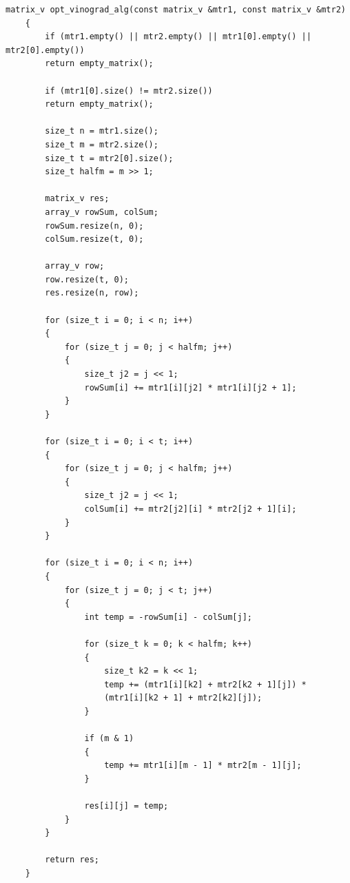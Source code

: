 \clearpage

\begin{lstlisting}[label={lst:opt_vinograd}, caption={Реализация оптимизированного алгоритма Винограда}]
	matrix_v opt_vinograd_alg(const matrix_v &mtr1, const matrix_v &mtr2)
	{
		if (mtr1.empty() || mtr2.empty() || mtr1[0].empty() || mtr2[0].empty())
		return empty_matrix();
		
		if (mtr1[0].size() != mtr2.size())
		return empty_matrix();
		
		size_t n = mtr1.size();
		size_t m = mtr2.size();
		size_t t = mtr2[0].size();
		size_t halfm = m >> 1;
		
		matrix_v res;
		array_v rowSum, colSum;
		rowSum.resize(n, 0);
		colSum.resize(t, 0);
		
		array_v row;
		row.resize(t, 0);
		res.resize(n, row);
		
		for (size_t i = 0; i < n; i++)
		{
			for (size_t j = 0; j < halfm; j++)
			{
				size_t j2 = j << 1;
				rowSum[i] += mtr1[i][j2] * mtr1[i][j2 + 1];
			}
		}
		
		for (size_t i = 0; i < t; i++)
		{
			for (size_t j = 0; j < halfm; j++)
			{
				size_t j2 = j << 1;
				colSum[i] += mtr2[j2][i] * mtr2[j2 + 1][i];
			}
		}
		
		for (size_t i = 0; i < n; i++)
		{
			for (size_t j = 0; j < t; j++)
			{
				int temp = -rowSum[i] - colSum[j];
				
				for (size_t k = 0; k < halfm; k++)
				{
					size_t k2 = k << 1;
					temp += (mtr1[i][k2] + mtr2[k2 + 1][j]) * 
					(mtr1[i][k2 + 1] + mtr2[k2][j]);
				}
				
				if (m & 1)
				{
					temp += mtr1[i][m - 1] * mtr2[m - 1][j];
				}
				
				res[i][j] = temp;
			}
		}
		
		return res;
	}
\end{lstlisting}